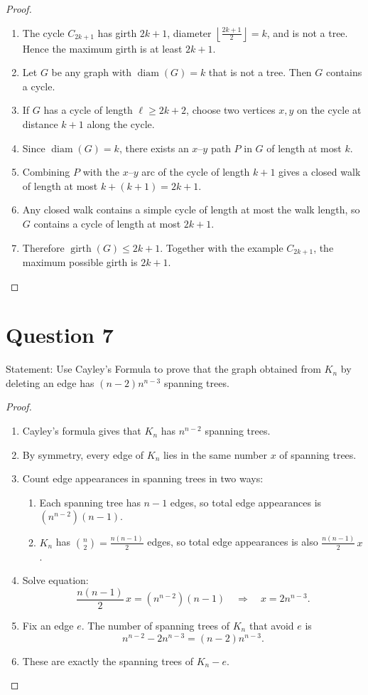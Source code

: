 \documentclass[11pt]{article}
\newcommand{\diam}{\operatorname{diam}}
\begin{document}
\begin{proof}
~
\begin{enumerate}
\item The cycle $C_{2k+1}$ has girth $2k+1$, diameter $\left\lfloor\frac{2k+1}{2}\right\rfloor=k$, and is not a tree. Hence the maximum girth is at least $2k+1$.
\item Let $G$ be any graph with $\diam(G)=k$ that is not a tree. Then $G$ contains a cycle.
\item If $G$ has a cycle of length $\ell\ge 2k+2$, choose two vertices $x,y$ on the cycle at distance $k+1$ along the cycle.
\item Since $\diam(G)=k$, there exists an $x$--$y$ path $P$ in $G$ of length at most $k$.
\item Combining $P$ with the $x$--$y$ arc of the cycle of length $k+1$ gives a closed walk of length at most $k+(k+1)=2k+1$.
\item Any closed walk contains a simple cycle of length at most the walk length, so $G$ contains a cycle of length at most $2k+1$.
\item Therefore $\operatorname{girth}(G)\le 2k+1$. Together with the example $C_{2k+1}$, the maximum possible girth is $2k+1$.
\end{enumerate}
\end{proof}

\newpage

\section*{Question 7}
Statement: Use Cayley’s Formula to prove that the graph obtained from $K_n$ by deleting an edge has $(n-2)n^{n-3}$ spanning trees.

\begin{proof}
~
\begin{enumerate}
\item Cayley’s formula gives that $K_n$ has $n^{n-2}$ spanning trees.
\item By symmetry, every edge of $K_n$ lies in the same number $x$ of spanning trees.
\item Count edge appearances in spanning trees in two ways:
\begin{enumerate}
\item Each spanning tree has $n-1$ edges, so total edge appearances is $(n^{n-2})(n-1)$.
\item $K_n$ has $\binom{n}{2}=\frac{n(n-1)}{2}$ edges, so total edge appearances is also $\frac{n(n-1)}{2}\,x$.
\end{enumerate}
\item Solve equation:
\[
\frac{n(n-1)}{2}\,x=(n^{n-2})(n-1)
\quad\Longrightarrow\quad
x=2n^{n-3}.
\]
\item Fix an edge $e$. The number of spanning trees of $K_n$ that avoid $e$ is
\[
n^{n-2}-2n^{n-3}=(n-2)n^{n-3}.
\]
\item These are exactly the spanning trees of $K_n-e$.
\end{enumerate}
\end{proof}
\end{document}
